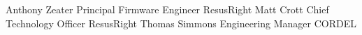 %
%
%

\begin{referees}
		{Anthony Zeater}
		{Principal Firmware Engineer}
		{ResusRight}
		{ }
		{Matt Crott}
		{Chief Technology Officer}
		{ResusRight}
		{ }
		{Thomas Simmons}
		{Engineering Manager}
		{CORDEL}
		{ }
\end{referees}